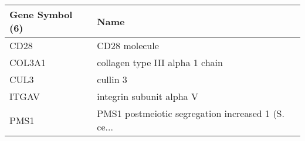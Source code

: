 \begin{tabular}{ll}
\toprule
Gene Symbol (6) &                                               Name \\
\midrule
           CD28 &                                      CD28 molecule \\
         COL3A1 &                    collagen type III alpha 1 chain \\
           CUL3 &                                           cullin 3 \\
          ITGAV &                           integrin subunit alpha V \\
           PMS1 & PMS1 postmeiotic segregation increased 1 (S. ce... \\
\bottomrule
\end{tabular}
